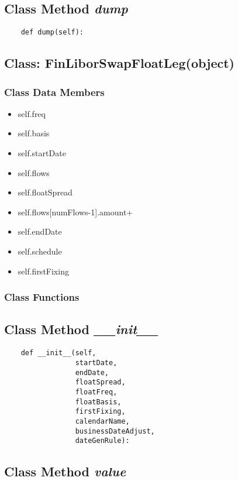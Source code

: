 \documentclass[twoside,11pt]{book}
\begin{document}
\subsection{Class Method {\it dump}}


\begin{lstlisting}
    def dump(self):
\end{lstlisting}

\subsection{Class: FinLiborSwapFloatLeg(object)}


\subsubsection{Class Data Members}
\begin{itemize}
\item{self.freq}
\item{self.basis}
\item{self.startDate}
\item{self.flows}
\item{self.floatSpread}
\item{self.flows[numFlows-1].amount+}
\item{self.endDate}
\item{self.schedule}
\item{self.firstFixing}
\end{itemize}

\subsubsection{Class Functions}

\subsection{Class Method {\it \_\_init\_\_}}


\begin{lstlisting}
    def __init__(self,
                 startDate,
                 endDate,
                 floatSpread,
                 floatFreq,
                 floatBasis,
                 firstFixing,
                 calendarName,
                 businessDateAdjust,
                 dateGenRule):
\end{lstlisting}

\subsection{Class Method {\it value}}
\end{document}
